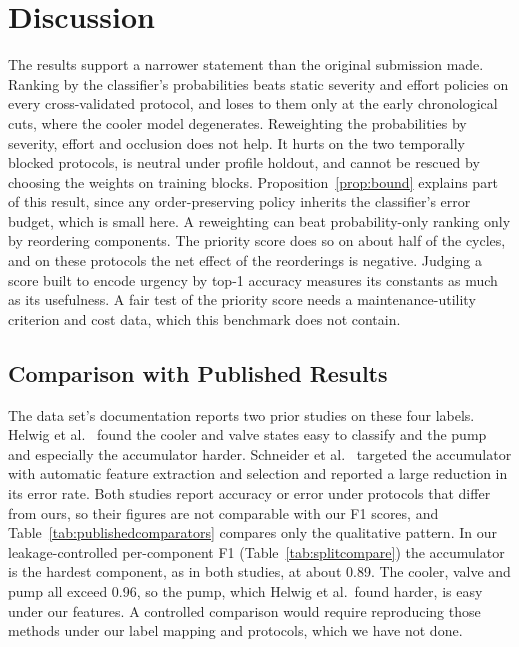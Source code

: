 \documentclass[journal]{IEEEtran}
\begin{document}
\section{Discussion}
\label{sec:discussion}

The results support a narrower statement than the original submission made. Ranking by the classifier's probabilities beats static severity and effort
policies on every cross-validated protocol, and loses to them only at the early
chronological cuts, where the cooler model degenerates. Reweighting the probabilities by severity, effort and occlusion does not help. It hurts on the two
temporally blocked protocols, is neutral under profile holdout, and cannot be
rescued by choosing the weights on training blocks. Proposition~\ref{prop:bound} explains part of this result, since any order-preserving policy inherits the classifier's error budget, which is small here. A reweighting can beat probability-only ranking only by reordering components. The priority score does so on about half of the
cycles, and on these protocols the net effect of the reorderings is negative. Judging a score built to encode urgency by top-1 accuracy
measures its constants as much as its usefulness. A fair test of the priority score
needs a maintenance-utility criterion and cost data, which this benchmark does not
contain.

\subsection{Comparison with Published Results}
\label{sec:publishedcomparators}

The data set's documentation reports two prior studies on these four labels.
Helwig et al.\ \cite{Helwig2015Hydraulic} found the cooler and valve states easy to
classify and the pump and especially the accumulator harder. Schneider et al.\
\cite{Schneider2017FeatureExtraction} targeted the accumulator with automatic feature
extraction and selection and reported a large reduction in its error rate. Both
studies report accuracy or error under protocols that differ from ours, so their
figures are not comparable with our F1 scores, and Table~\ref{tab:publishedcomparators}
compares only the qualitative pattern. In our leakage-controlled per-component F1
(Table~\ref{tab:splitcompare}) the accumulator is the hardest component, as in both studies, at about 0.89. The cooler, valve and pump all exceed 0.96, so the pump, which Helwig et al.\ found harder, is easy under our features. A controlled comparison would require
reproducing those methods under our label mapping and protocols, which we have not
done.
\end{document}
